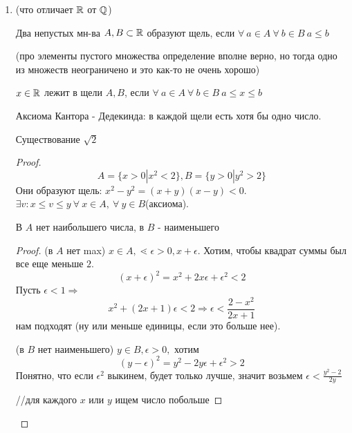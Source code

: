 \documentclass[12pt]{report}
\begin{document}
\begin{defn}[ = Аксиоматический подход к построению $\R$]
\begin{enumerate}
\begin{cor}
$x > 0, a < b$, то в $<a, b>$ содержится точка вида $r * x, r \in \Q$
\end{cor}
\begin{proof}
По \ref{thm1}: применим к $<\frac{a}{x}, \frac{b}{x}>$
\end{proof}

\item (что отличает $\R$ от $\mathbb{Q}$)

\begin{defn}[Щель]
Два непустых мн-ва $A, B \subset \mathbb{R}$ образуют щель, если $\forall ~a \in A ~\forall~ b \in B ~a \le b$

(про элементы пустого множества определение вполне верно, но тогда одно из множеств неограничено и это как-то не очень хорошо)
\end{defn}

\begin{defn}
$x \in \mathbb{R}$ лежит в щели $A, B$, если $\forall~ a \in A ~\forall~ b \in B ~a \le x \le b$

Аксиома Кантора - Дедекинда: в каждой щели есть хотя бы одно число.
\end{defn}

\begin{cor}
Существование $\sqrt{2}$
\end{cor}
\begin{proof}
$$A = \{x > 0 | x^2 < 2\}, B = \{y > 0 | y^2 > 2 \}$$
Они образуют щель: $x^2 - y^2 = (x + y)(x - y) < 0$. $\exists v: x \le v \le y ~\forall~ x \in A, ~\forall~ y \in B$(аксиома).

\begin{lm}
В $A$ нет наибольшего числа, в $B$ - наименьшего
\end{lm}
\begin{proof}
(в $A$ нет max) $x \in A, \lessdot \epsilon > 0, x + \epsilon$. Хотим, чтобы квадрат суммы был все еще меньше $2$.
$$(x + \epsilon)^2 = x^2 + 2x\epsilon + \epsilon^2 < 2$$
Пусть $\epsilon < 1 \Rightarrow$
$$x^2 + (2x + 1)\epsilon < 2 \Rightarrow \epsilon < \frac{2 - x^2}{2x + 1}$$
нам подходят (ну или меньше единицы, если это больше нее).

(в $B$ нет наименьшего) $y \in B, \epsilon > 0,$ хотим 
$$(y - \epsilon)^2 = y^2 - 2y\epsilon + \epsilon^2 > 2$$
Понятно, что если $\epsilon^2$ выкинем, будет только лучше, значит возьмем $\epsilon < \frac{y^2 - 2}{2y}$

//для каждого $x$ или $y$ ищем число побольше
\end{proof}


\end{proof}
\end{enumerate}
\end{defn}
\end{document}
